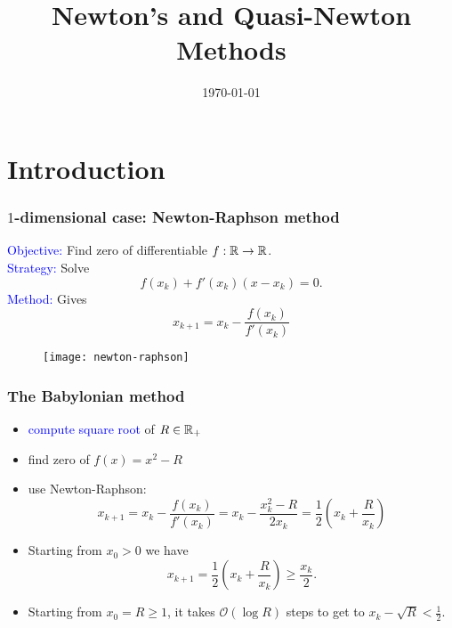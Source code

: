 \documentclass{beamer}
\title{Newton's and Quasi-Newton Methods}
\date{\today}
\begin{document}
\maketitle
\frame{\tableofcontents[currentsection]}

\section{Introduction}

\begin{frame}
  \frametitle{$1$-dimensional case: Newton-Raphson method}
  \begin{minipage}{0.48\textwidth}
    \textcolor{blue}{Objective:} Find zero of differentiable $f: \mathbb{R} \to \mathbb{R}$.\\
    \textcolor{blue}{Strategy:} Solve
    \begin{equation}
      f(x_k) + f'(x_k) (x - x_k) = 0.
    \end{equation}
    \textcolor{blue}{Method:} Gives
    \begin{equation}
      x_{k+1} = x_k - \frac{f(x_k)}{f'(x_k)}
    \end{equation}
  \end{minipage}
  \hfill
  \begin{minipage}{0.48\textwidth}
    \begin{figure}[ht]
      \centering
      \texttt{[image: newton-raphson]}
    \end{figure}
  \end{minipage}
\end{frame}

\begin{frame}
  \frametitle{The Babylonian method}
  \begin{itemize}
    \item \textcolor{blue}{compute square root} of $R \in \mathbb{R}_+$
    \item find zero of $f(x) = x^2 - R$
    \item use Newton-Raphson:
          \begin{equation}
            x_{k+1} = x_k - \frac{f(x_k)}{f'(x_k)} = x_k - \frac{x_k^2 - R}{2 x_k} = \frac12 \left( x_k + \frac{R}{x_k} \right)
          \end{equation}
    \item Starting from $x_0 > 0$ we have
          \begin{equation}
            x_{k+1} = \frac12 \left( x_k + \frac{R}{x_k} \right) \ge \frac{x_k}{2}.
          \end{equation}
    \item Starting from $x_0 = R \ge 1$, it takes $\mathcal{O}(\log R)$ steps to get to $x_k - \sqrt{R} < \frac12$.
  \end{itemize}
\end{frame}
\end{document}
